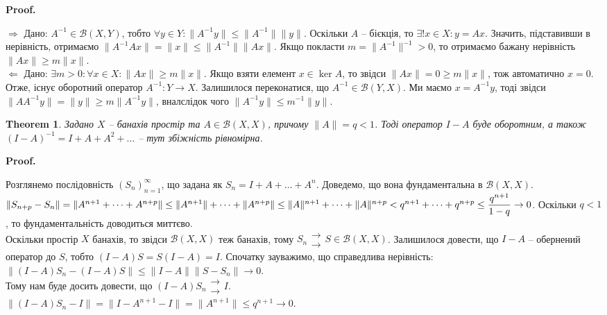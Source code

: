 \documentclass[a4paper, 10pt]{article}
\makeatletter
\def\rightproof{$\boxed{\Rightarrow}$ }
\def\leftproof{$\boxed{\Leftarrow}$ }
\theoremstyle{theoremdd}
\newtheorem{theorem}{Theorem}[subsection]
\theoremstyle{theoremdd}
\theoremstyle{theoremdd}
\theoremstyle{theoremdd}
\theoremstyle{theoremdd}
\theoremstyle{theoremdd}
\theoremstyle{theoremdd}
\theoremstyle{theoremdd}
\renewenvironment{proof}[1][Proof.\\]{\par
\pushQED{\hfill \qed}%
\normalfont \topsep6\p@\@plus6\p@\relax
\trivlist
\item\relax
{\bfseries
#1\@addpunct{.}}\hspace\labelsep\ignorespaces
}{%
\popQED\endtrivlist\@endpefalse
}
\makeatother
\begin{document}
\begin{proof}
\rightproof Дано: $A^{-1} \in \mathcal{B}(X,Y)$, тобто $\forall y \in Y: \|A^{-1}y\| \leq \|A^{-1}\| \|y\|$. Оскільки $A$ -- бієкція, то $\exists! x \in X: y = Ax$. Значить, підставивши в нерівність, отримаємо $\|A^{-1} Ax\| = \|x\| \leq \|A^{-1}\| \|Ax\|$. Якщо покласти $m = \|A^{-1}\|^{-1} > 0$, то отримаємо бажану нерівність $\|Ax\| \geq m\|x\|$.
\bigskip \\
\leftproof Дано: $\exists m > 0: \forall x \in X: \|Ax\| \geq m\|x\|$. Якщо взяти елемент $x \in \ker A$, то звідси $\|Ax\| = 0 \geq m \|x\|$, тож автоматично $x = 0$. Отже, існує оборотний оператор $A^{-1} \colon Y \to X$. Залишилося переконатися, що $A^{-1} \in \mathcal{B}(Y,X)$. Ми маємо $x = A^{-1}y$, тоді звідси $\|AA^{-1}y\| = \|y\| \geq m \|A^{-1}y\|$, вналслідок чого $\|A^{-1}y\| \leq m^{-1} \|y\|$.
\end{proof}

\begin{theorem}
\label{invertible_and_geometric_progression}
Задано $X$ -- банахів простір та $A \in \mathcal{B}(X,X)$, причому $\|A\| = q < 1$. Тоді оператор $I-A$ буде оборотним, а також $(I-A)^{-1} = I + A + A^2 + \dots$ -- тут збіжність рівномірна.
\end{theorem}

\begin{proof}
Розглянемо послідовність $(S_n)_{n=1}^\infty$, що задана як $S_n = I + A + \dots + A^n$. Доведемо, що вона фундаментальна в $\mathcal{B}(X,X)$.\\
$\|S_{n+p} - S_n\| = \| A^{n+1} + \dots + A^{n+p}\| \leq \|A^{n+1}\| + \dots + \|A^{n+p}\| \leq \|A\|^{n+1} + \dots + \|A\|^{n+p} < q^{n+1} + \dots + q^{n+p} \\ \leq \dfrac{q^{n+1}}{1-q} \to 0$. Оскільки $q < 1$, то фундаментальність доводиться миттєво.\\
Оскільки простір $X$ банахів, то звідси $\mathcal{B}(X,X)$ теж банахів, тому $S_n \substack{\to \\ \to} S \in \mathcal{B}(X,X)$. Залишилося довести, що $I-A$ -- обернений оператор до $S$, тобто $(I-A)S = S(I-A) = I$. Спочатку зауважимо, що справедлива нерівність:\\
$\|(I-A)S_n - (I-A)S\| \leq \|I-A\| \|S-S_n\| \to 0$.\\
Тому нам буде досить довести, що $(I-A)S_n \substack{\to \\ \to} I$.\\
$\| (I-A)S_n - I\| = \|I - A^{n+1} - I\| = \|A^{n+1}\| \leq q^{n+1} \to 0$.
\end{proof}
\end{document}
